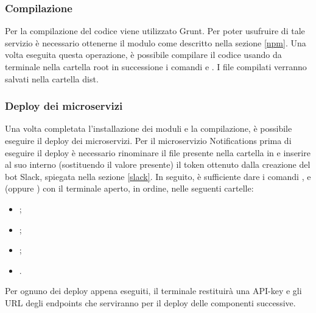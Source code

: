 \subsubsection{Compilazione}
Per la compilazione del codice viene utilizzato Grunt. Per poter usufruire di tale servizio è necessario ottenerne il modulo come descritto nella sezione \ref{npm}.
Una volta eseguita questa operazione, è possibile compilare il codice usando da terminale nella cartella root in successione i comandi  e . I file compilati verranno salvati nella cartella dist.

\subsubsection{Deploy dei microservizi}\label{deploy-micro}
Una volta completata l'installazione dei moduli e la compilazione, è possibile eseguire il deploy dei microservizi. Per il microservizio Notifications prima di eseguire il deploy è necessario rinominare il file  presente nella cartella  in  e inserire al suo interno (sostituendo il valore presente) il token ottenuto dalla creazione del bot Slack, spiegata nella sezione \ref{slack}.
In seguito, è sufficiente dare i comandi  ,  e  (oppure ) con il terminale aperto, in ordine, nelle seguenti cartelle:
\begin{itemize}
	\item {};
	\item {};
	\item {};
	\item {}.
\end{itemize}
Per ognuno dei deploy appena eseguiti, il terminale restituirà una API-key e gli URL degli endpoints che serviranno per il deploy delle componenti successive.

